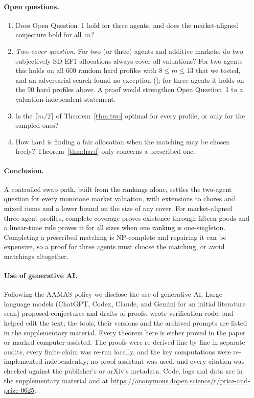 \documentclass[sigconf,anonymous]{aamas}
\begin{document}
\paragraph{Open questions.}
\begin{enumerate}
\item Does Open Question~1 hold for three agents, and does the market-aligned conjecture hold for all~$m$?
\item \emph{Two-cover question.} For two (or three) agents and additive markets, do two subjectively SD-EF1 allocations always cover all valuations? For two agents this holds on all $600$ random hard profiles with $8\le m\le13$ that we tested, and an adversarial search found no exception (\appFamily); for three agents it holds on the $90$ hard profiles above. A proof would strengthen Open Question~1 to a valuation-independent statement.
\item Is the $\lceil m/2\rceil$ of Theorem~\ref{thm:two} optimal for every profile, or only for the sampled ones?
\item How hard is finding a fair allocation when the matching may be chosen freely? Theorem~\ref{thm:hard} only concerns a prescribed one.
\end{enumerate}

\paragraph{Conclusion.}
A controlled swap path, built from the rankings alone, settles the two-agent question for every monotone market valuation, with extensions to chores and mixed items and a lower bound on the size of any cover. For market-aligned three-agent profiles, complete coverage proves existence through fifteen goods and a linear-time rule proves it for all sizes when one ranking is one-singleton. Completing a prescribed matching is NP-complete and repairing it can be expensive, so a proof for three agents must choose the matching, or avoid matchings altogether.

\paragraph{Use of generative AI\@.}
Following the AAMAS policy we disclose the use of generative AI. Large language models (ChatGPT, Codex, Claude, and Gemini for an initial literature scan) proposed conjectures and drafts of proofs, wrote verification code, and helped edit the text; the tools, their versions and the archived prompts are listed in the supplementary material. Every theorem here is either proved in the paper or marked computer-assisted. The proofs were re-derived line by line in separate audits, every finite claim was re-run locally, and the key computations were re-implemented independently; no proof assistant was used, and every citation was checked against the publisher's or arXiv's metadata. Code, logs and data are in the supplementary material and at \url{https://anonymous.4open.science/r/price-and-prize-0625}.



\end{document}

